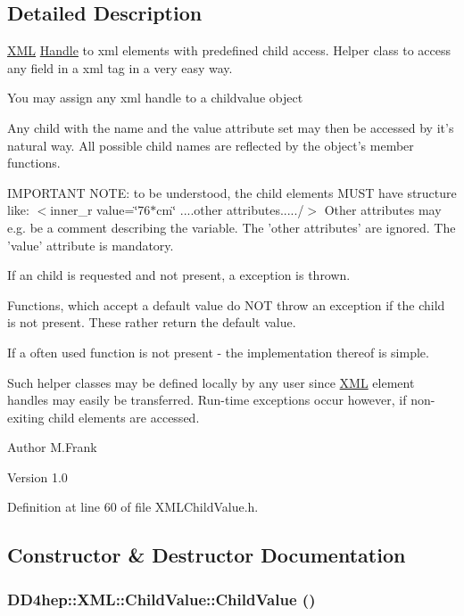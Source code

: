 \subsection{Detailed Description}
\hyperlink{namespace_d_d4hep_1_1_x_m_l}{XML} \hyperlink{class_d_d4hep_1_1_handle}{Handle} to xml elements with predefined child access. Helper class to access any field in a xml tag in a very easy way.
\begin{DoxyItemize}
\item You may assign any xml handle to a childvalue object
\item Any child with the name and the value attribute set may then be accessed by it's natural way. All possible child names are reflected by the object's member functions.
\end{DoxyItemize}

IMPORTANT NOTE: to be understood, the child elements MUST have structure like: $<$inner\_\-r value=\char`\"{}76$\ast$cm\char`\"{} ....other attributes...../$>$ Other attributes may e.g. be a comment describing the variable. The 'other attributes' are ignored. The 'value' attribute is mandatory.


\begin{DoxyItemize}
\item If an child is requested and not present, a exception is thrown.
\item Functions, which accept a default value do NOT throw an exception if the child is not present. These rather return the default value.
\item If a often used function is not present -\/ the implementation thereof is simple.
\end{DoxyItemize}

Such helper classes may be defined locally by any user since \hyperlink{namespace_d_d4hep_1_1_x_m_l}{XML} element handles may easily be transferred. Run-\/time exceptions occur however, if non-\/exiting child elements are accessed.

\begin{DoxyAuthor}{Author}
M.Frank 
\end{DoxyAuthor}
\begin{DoxyVersion}{Version}
1.0 
\end{DoxyVersion}


Definition at line 60 of file XMLChildValue.h.

\subsection{Constructor \& Destructor Documentation}
\hypertarget{struct_d_d4hep_1_1_x_m_l_1_1_child_value_aa23bcc094d5069317c5e0dba4e0007ce}{
\subsubsection[{ChildValue}]{\setlength{\rightskip}{0pt plus 5cm}DD4hep::XML::ChildValue::ChildValue ()}}
\label{struct_d_d4hep_1_1_x_m_l_1_1_child_value_aa23bcc094d5069317c5e0dba4e0007ce}


